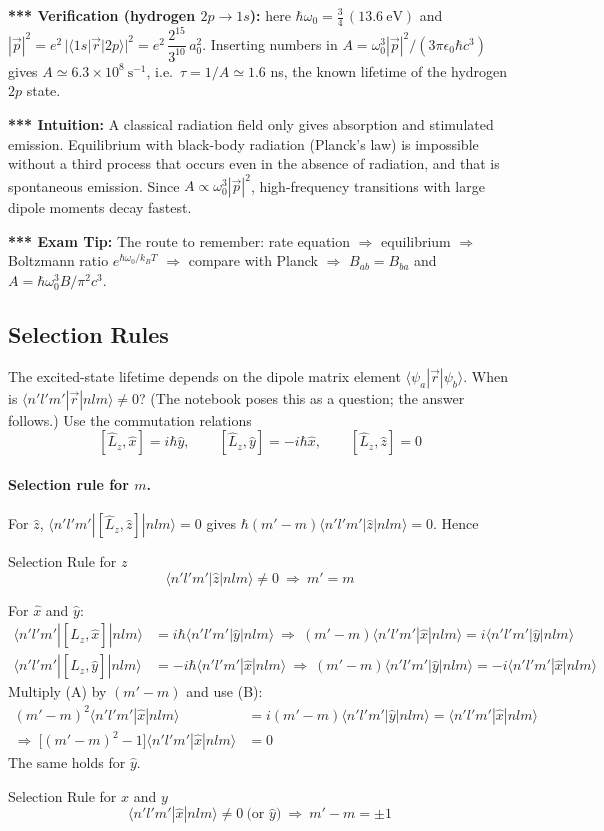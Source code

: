 \documentclass[11pt,a4paper]{article}
\begin{document}
\textbf{*** Verification (hydrogen $2p\to1s$):} here $\hbar\omega_0=\tfrac34\,(13.6\ \text{eV})$ and $|\vec p|^2=e^2\,|\langle1s|\vec r|2p\rangle|^2=e^2\,\dfrac{2^{15}}{3^{10}}\,a_0^2$. Inserting numbers in $A=\omega_0^3|\vec p|^2/(3\pi\epsilon_0\hbar c^3)$ gives $A\simeq6.3\times10^{8}\ \text{s}^{-1}$, i.e.\ $\tau=1/A\simeq1.6$ ns, the known lifetime of the hydrogen $2p$ state.

\textbf{*** Intuition:} A classical radiation field only gives absorption and stimulated emission. Equilibrium with black-body radiation (Planck's law) is impossible without a third process that occurs even in the absence of radiation, and that is spontaneous emission. Since $A\propto\omega_0^3|\vec p|^2$, high-frequency transitions with large dipole moments decay fastest.

\textbf{*** Exam Tip:} The route to remember: rate equation $\Rightarrow$ equilibrium $\Rightarrow$ Boltzmann ratio $e^{\hbar\omega_0/k_BT}$ $\Rightarrow$ compare with Planck $\Rightarrow$ $B_{ab}=B_{ba}$ and $A=\hbar\omega_0^3B/\pi^2c^3$.

\subsection{Selection Rules}
The excited-state lifetime depends on the dipole matrix element $\langle\psi_a|\vec r|\psi_b\rangle$. When is $\langle n'l'm'|\vec r|nlm\rangle\neq0$? (The notebook poses this as a question; the answer follows.) Use the commutation relations
\[
[\hat L_z,\hat x]=i\hbar\hat y,\qquad[\hat L_z,\hat y]=-i\hbar\hat x,\qquad[\hat L_z,\hat z]=0
\]
\paragraph{Selection rule for $m$.} For $\hat z$, $\langle n'l'm'|[\hat L_z,\hat z]|nlm\rangle=0$ gives $\hbar(m'-m)\langle n'l'm'|\hat z|nlm\rangle=0$. Hence
\begin{thm}{Selection Rule for $z$}
\[
\langle n'l'm'|\hat z|nlm\rangle\neq0\ \Longrightarrow\ m'=m
\]
\end{thm}
For $\hat x$ and $\hat y$:
\begin{align*}
\langle n'l'm'|[\hat L_z,\hat x]|nlm\rangle&=i\hbar\langle n'l'm'|\hat y|nlm\rangle\ \Longrightarrow\ (m'-m)\langle n'l'm'|\hat x|nlm\rangle=i\langle n'l'm'|\hat y|nlm\rangle \tag{A}\\
\langle n'l'm'|[\hat L_z,\hat y]|nlm\rangle&=-i\hbar\langle n'l'm'|\hat x|nlm\rangle\ \Longrightarrow\ (m'-m)\langle n'l'm'|\hat y|nlm\rangle=-i\langle n'l'm'|\hat x|nlm\rangle \tag{B}
\end{align*}
Multiply (A) by $(m'-m)$ and use (B):
\begin{align*}
(m'-m)^2\langle n'l'm'|\hat x|nlm\rangle&=i(m'-m)\langle n'l'm'|\hat y|nlm\rangle=\langle n'l'm'|\hat x|nlm\rangle\\
\Longrightarrow\ \big[(m'-m)^2-1\big]\langle n'l'm'|\hat x|nlm\rangle&=0
\end{align*}
The same holds for $\hat y$.
\begin{thm}{Selection Rule for $x$ and $y$}
\[
\langle n'l'm'|\hat x|nlm\rangle\neq0\ \text{(or }\hat y)\ \Longrightarrow\ m'-m=\pm1
\]
\end{thm}
\end{document}
